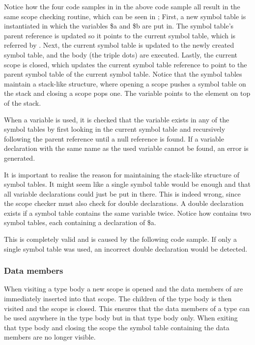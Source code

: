 Notice how the four code samples in in the above code sample all result in the same
scope checking routine, which can be seen in ; First, a new
symbol table is instantiated in which the variables \$a and \$b are put in. The
symbol table's parent reference is updated so it points to the current symbol
table, which is referred by  . Next, the
current symbol table is updated to the newly created symbol table, and the body
(the triple dots) are executed. Lastly, the current scope is closed, which
updates the current symbol table reference to point to the parent symbol table
of the current symbol table.  Notice that the symbol tables maintain a
stack-like structure, where opening a scope pushes a symbol table on the stack
and closing a scope pops one. The variable 
 points to the element on top of the stack.

When a variable is used, it is checked that the variable exists in any of the
symbol tables by first looking in the current symbol table and recursively
following the parent reference until a null reference is found. If a variable
declaration with the same name as the used variable cannot be found, an error is
generated.


It is important to realise the reason for maintaining the stack-like structure
of symbol tables. It might seem like a single symbol table would be enough and
that all variable declarations could just be put in there. This is indeed wrong,
since the scope checker must also check for double declarations. A double
declaration exists if a symbol table contains the same variable twice. Notice
how  contains two symbol tables, each containing a
declaration of \$a. 


This is completely valid and is caused by the following code sample. If only a
single symbol table was used, an incorrect double declaration would be detected.


\subsubsection{Data members}
When visiting a type body a new scope is opened and the data members of
  are immediately inserted into that
scope. The children of the type body is then visited and the scope is closed.
This ensures that the data members of a type can be used anywhere in the type
body but in that type body only. When exiting that type body and closing the
scope the symbol table containing the data members are no longer visible.

